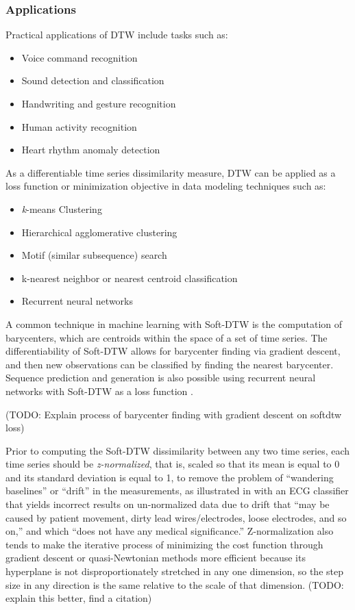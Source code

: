 \documentclass[12pt, letterpaper]{article}
\begin{document}
\subsubsection{Applications}

Practical applications of DTW include tasks such as:

\begin{itemize}
    \item Voice command recognition
    \item Sound detection and classification
    \item Handwriting and gesture recognition
    \item Human activity recognition
    \item Heart rhythm anomaly detection
\end{itemize}

As a differentiable time series dissimilarity measure, DTW can be applied as a
loss function or minimization objective in data modeling techniques such as:

\begin{itemize}
  \item \emph{k}-means Clustering
  \item Hierarchical agglomerative clustering
  \item Motif (similar subsequence) search
  \item k-nearest neighbor or nearest centroid classification
  \item Recurrent neural networks
\end{itemize}

A common technique in machine learning with Soft-DTW is the computation of
barycenters, which are centroids within the space of a set of time series. The
differentiability of Soft-DTW allows for barycenter finding via gradient
descent, and then new observations can be classified by finding the nearest
barycenter. Sequence prediction and generation is also possible using
recurrent neural networks with Soft-DTW as a loss function
\cite{cuturi_soft-dtw_2018}.

(TODO: Explain process of barycenter finding with gradient descent on softdtw
loss)

Prior to computing the Soft-DTW dissimilarity between any two time series, each
time series should be \emph{z-normalized}, that is, scaled so that its mean is
equal to 0 and its standard deviation is equal to 1, to remove the problem of
``wandering baselines'' or ``drift'' in the measurements, as illustrated in
\cite{rakthanmanon_addressing_2013} with an ECG classifier that yields incorrect
results on un-normalized data due to drift that ``may be caused by patient
movement, dirty lead wires/electrodes, loose electrodes, and so on,'' and which
``does not have any medical significance.'' Z-normalization also tends to make
the iterative process of minimizing the cost function through gradient descent
or quasi-Newtonian methods more efficient because its hyperplane is not
disproportionately stretched in any one dimension, so the step size in any
direction is the same relative to the scale of that dimension. (TODO: explain
this better, find a citation)
\end{document}
